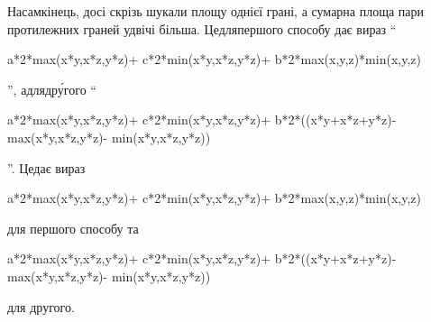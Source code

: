{
\def\paralAnsFirst{\begin{ttfamily}{%
\mbox{a*2*max(x*y,x*z,y*z)}\nolinebreak[1]\hspace{0.25em plus 0.5em}+\linebreak[1]\hspace{0.25em plus 0.5em}%
\mbox{c*2*min(x*y,x*z,y*z)}\nolinebreak[2]\hspace{0.25em plus 0.5em}+\linebreak[1]\hspace{0.25em plus 0.5em}%
\mbox{b*2*max(x,y,z)*min(x,y,z)}}\end{ttfamily}}
\def\paralAnsSecond{\begin{ttfamily}{%
\mbox{a*2*max(x*y,x*z,y*z)}\nolinebreak[1]\hspace{0.125em plus 0.5em}+\linebreak[1]\hspace{0.125em plus 0.5em}%
\mbox{c*2*min(x*y,x*z,y*z)}\nolinebreak[1]\hspace{0.125em plus 0.5em}+\linebreak[1]\hspace{0.125em plus 0.5em}%
\mbox{b*2*((x*y+x*z+y*z)}\nolinebreak[3]\hspace{0.0625em plus 0.125em}-\linebreak[1]\hspace{0.0625em plus 0.125em}%
\mbox{max(x*y,x*z,y*z)}\nolinebreak[3]\hspace{0.0625em plus 0.125em}-\linebreak[1]\hspace{0.0625em plus 0.125em}%
\mbox{min(x*y,x*z,y*z)})}\end{ttfamily}}

Насамкінець, досі скрізь шукали площу однієї грані, а сумарна площа пари протилежних граней удвічі більша.
\ifAfour
Це\nolinebreak[3] для\nolinebreak[2] першого способу дає вираз ``\paralAnsFirst'',
а\nolinebreak[3]  для\nolinebreak[2] др\'{у}гого ``\paralAnsSecond''.
\else
Це\nolinebreak[3] дає вираз \paralAnsFirst{}
для першого способу та
\paralAnsSecond{} для другого.
\fi

}

